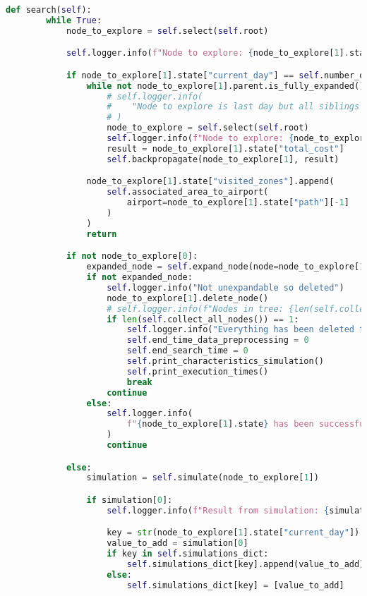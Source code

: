 \begin{lstlisting}[language = Python]
    def search(self):
        while True:
            node_to_explore = self.select(self.root)

            self.logger.info(f"Node to explore: {node_to_explore[1].state}")

            if node_to_explore[1].state["current_day"] == self.number_of_areas + 1:
                while not node_to_explore[1].parent.is_fully_expanded():
                    # self.logger.info(
                    #    "Node to explore is last day but all siblings have not been visited yet"
                    # )
                    node_to_explore = self.select(self.root)
                    self.logger.info(f"Node to explore: {node_to_explore[1].state}")
                    result = node_to_explore[1].state["total_cost"]
                    self.backpropagate(node_to_explore[1], result)

                node_to_explore[1].state["visited_zones"].append(
                    self.associated_area_to_airport(
                        airport=node_to_explore[1].state["path"][-1]
                    )
                )
                return

            if not node_to_explore[0]:
                expanded_node = self.expand_node(node=node_to_explore[1])
                if not expanded_node:
                    self.logger.info("Not unexpandable so deleted")
                    node_to_explore[1].delete_node()
                    # self.logger.info(f"Nodes in tree: {len(self.collect_all_nodes())}")
                    if len(self.collect_all_nodes()) == 1:
                        self.logger.info("Everything has been deleted to the root node")
                        self.end_time_data_preprocessing = 0
                        self.end_search_time = 0
                        self.print_characteristics_simulation()
                        self.print_execution_times()
                        break
                    continue
                else:
                    self.logger.info(
                        f"{node_to_explore[1].state} has been successfully expanded"
                    )
                    continue

            else:
                simulation = self.simulate(node_to_explore[1])

                if simulation[0]:
                    self.logger.info(f"Result from simulation: {simulation[0]}")

                    key = str(node_to_explore[1].state["current_day"])
                    value_to_add = simulation[0]
                    if key in self.simulations_dict:
                        self.simulations_dict[key].append(value_to_add)
                    else:
                        self.simulations_dict[key] = [value_to_add]


\end{lstlisting}
